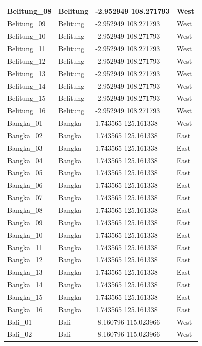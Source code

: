 \documentclass[
]{article}
\begin{document}
\begin{table}
\begin{tabular}{l|l|l|l}
\hline
Belitung\_08 & Belitung & -2.952949 108.271793 & West\\
\hline
Belitung\_09 & Belitung & -2.952949 108.271793 & West\\
\hline
Belitung\_10 & Belitung & -2.952949 108.271793 & West\\
\hline
Belitung\_11 & Belitung & -2.952949 108.271793 & West\\
\hline
Belitung\_12 & Belitung & -2.952949 108.271793 & West\\
\hline
Belitung\_13 & Belitung & -2.952949 108.271793 & West\\
\hline
Belitung\_14 & Belitung & -2.952949 108.271793 & West\\
\hline
Belitung\_15 & Belitung & -2.952949 108.271793 & West\\
\hline
Belitung\_16 & Belitung & -2.952949 108.271793 & West\\
\hline
Bangka\_01 & Bangka & 1.743565 125.161338 & West\\
\hline
Bangka\_02 & Bangka & 1.743565 125.161338 & East\\
\hline
Bangka\_03 & Bangka & 1.743565 125.161338 & East\\
\hline
Bangka\_04 & Bangka & 1.743565 125.161338 & East\\
\hline
Bangka\_05 & Bangka & 1.743565 125.161338 & East\\
\hline
Bangka\_06 & Bangka & 1.743565 125.161338 & East\\
\hline
Bangka\_07 & Bangka & 1.743565 125.161338 & East\\
\hline
Bangka\_08 & Bangka & 1.743565 125.161338 & East\\
\hline
Bangka\_09 & Bangka & 1.743565 125.161338 & East\\
\hline
Bangka\_10 & Bangka & 1.743565 125.161338 & East\\
\hline
Bangka\_11 & Bangka & 1.743565 125.161338 & East\\
\hline
Bangka\_12 & Bangka & 1.743565 125.161338 & East\\
\hline
Bangka\_13 & Bangka & 1.743565 125.161338 & East\\
\hline
Bangka\_14 & Bangka & 1.743565 125.161338 & East\\
\hline
Bangka\_15 & Bangka & 1.743565 125.161338 & East\\
\hline
Bangka\_16 & Bangka & 1.743565 125.161338 & East\\
\hline
Bali\_01 & Bali & -8.160796 115.023966 & West\\
\hline
Bali\_02 & Bali & -8.160796 115.023966 & West\\

\end{tabular}
\end{table}
\end{document}
